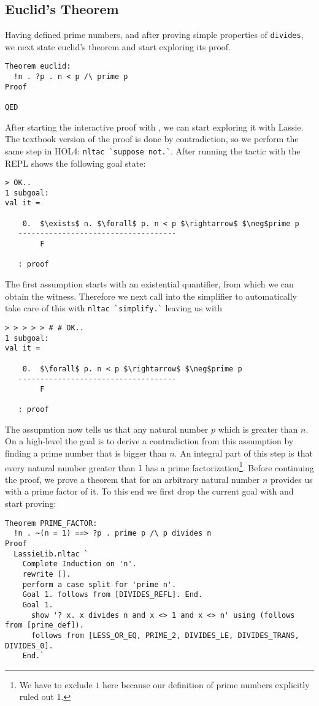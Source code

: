 \subsection{Euclid's Theorem}
Having defined prime numbers, and after proving simple properties of
\lstinline{divides}, we next state euclid's theorem and start
exploring its proof.

\begin{lstlisting}
Theorem euclid:
  !n . ?p . n < p /\ prime p
Proof

QED
\end{lstlisting}

After starting the interactive proof with , we can start exploring
it with Lassie.
The textbook version of the proof is done by contradiction, so we perform the
same step in HOL4: \lstinline{nltac `suppose not.`}.
After running the tactic with  the REPL shows the following goal state:
%
\begin{lstlisting}[frame=single, mathescape=true]
> OK..
1 subgoal:
val it =

    0.  $\exists$ n. $\forall$ p. n < p $\rightarrow$ $\neg$prime p
   ------------------------------------
        F

   : proof
\end{lstlisting}

The first assumption starts with an existential quantifier, from which we can
obtain the witness. Therefore we next call into the simplifier to automatically
take care of this with \lstinline{nltac `simplify.`} leaving us with
%
\begin{lstlisting}[frame=single, mathescape=true]
> > > > > # # OK..
1 subgoal:
val it =

    0.  $\forall$ p. n < p $\rightarrow$ $\neg$prime p
   ------------------------------------
        F

   : proof
\end{lstlisting}

The assupmtion now tells us that any natural number $p$ which is greater than
$n$.
On a high-level the goal is to derive a contradiction from this assumption by
finding a prime number that is bigger than $n$.
An integral part of this step is that every natural number greater than $1$ has
a prime factorization\footnote{We have to exclude $1$ here because our definition of prime numbers explicitly ruled out $1$.}.
Before continuing the proof, we prove a theorem that for an arbitrary natural
number $n$ provides us with a prime factor of it.
To this end we first drop the current goal with  and start proving:
%
\begin{lstlisting}
Theorem PRIME_FACTOR:
  !n . ~(n = 1) ==> ?p . prime p /\ p divides n
Proof
  LassieLib.nltac `
    Complete Induction on 'n'.
    rewrite [].
    perform a case split for 'prime n'.
    Goal 1. follows from [DIVIDES_REFL]. End.
    Goal 1.
      show '? x. x divides n and x <> 1 and x <> n' using (follows from [prime_def]).
      follows from [LESS_OR_EQ, PRIME_2, DIVIDES_LE, DIVIDES_TRANS, DIVIDES_0].
    End.`
\end{lstlisting}

